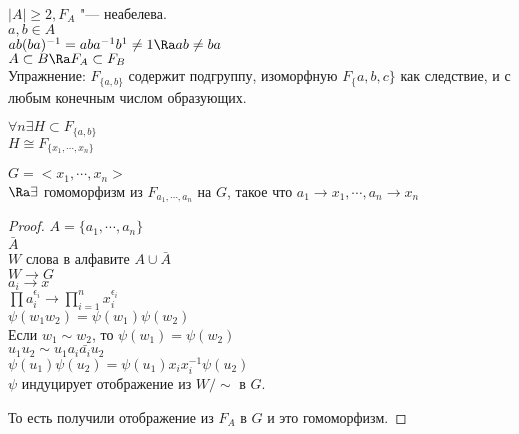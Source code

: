 \begin{exmp}
$|A| \ge 2, F_A$ "--- неабелева.\\
$a, b\in A$\\
$ab(ba)^{-1} = aba^{-1}b^{1} \ne 1\Ra ab \ne ba$ \\
$A \subset B \Ra F_A \subset F_B$\\
Упражнение: $F_{\{a, b\}}$ содержит подгруппу, изоморфную $F_\{a, b, c\}$ как
следствие, и с любым конечным числом образующих.
\end{exmp}
\begin{exmp}
$\forall n \exists H \subset F_{\{a, b\}}$ \\
$H \cong F_{\{x_1, \cdots, x_n\}}$\\
\end{exmp}
\begin{theorem}
$G = <x_1, \cdots, x_n>$\\
$\Ra \exists$ гомоморфизм из $F_{a_1, \cdots, a_n}$ на $G$, 
такое что $a_1 \to x_1, \cdots, a_n \to x_n$\\
\end{theorem}
\begin{proof}
$A = \{a_1, \cdots, a_n\}$ \\
$\bar{A}$\\
$W$ слова в алфавите $A \cup \bar{A}$\\
$W \to G$\\
$a_i \to x$\\
$\prod a_i^{\epsilon_i} \to \prod_{i = 1}^{n} x_i^{\epsilon_i}$\\
$\psi(w_1w_2) = \psi(w_1)\psi(w_2)$\\
Если $w_1 \sim w_2$, то $\psi(w_1) = \psi(w_2)$\\
$u_1u_2 \sim u_1a_i\bar{a_i}u_2$\\
$\psi(u_1)\psi(u_2) = \psi(u_1)x_ix_i^{-1}\psi(u_2)$\\
$\psi$ индуцирует отображение из $W/\sim$ в $G$.

То есть получили отображение из $F_A$ в $G$ и это
гомоморфизм.
\end{proof}